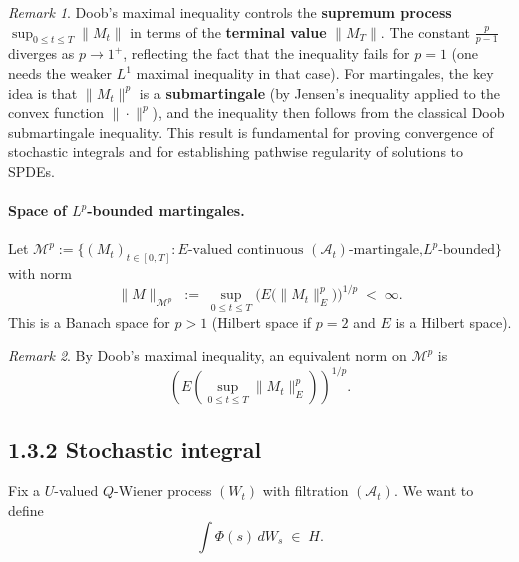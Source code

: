 \documentclass[11pt]{article}
\theoremstyle{definition}
\theoremstyle{remark}
\newtheorem{remark}{Remark}
\begin{document}
\begin{remark}
Doob's maximal inequality controls the \textbf{supremum process}
$\sup_{0 \le t \le T} \|M_t\|$ in terms of the \textbf{terminal value}
$\|M_T\|$.  The constant $\frac{p}{p-1}$ diverges as $p \to 1^+$,
reflecting the fact that the inequality fails for $p = 1$
(one needs the weaker $L^1$ maximal inequality in that case).
For martingales, the key idea is that $\|M_t\|^p$ is a
\textbf{submartingale} (by Jensen's inequality applied to the
convex function $\|\cdot\|^p$), and the inequality then follows
from the classical Doob submartingale inequality.
This result is fundamental for proving convergence of stochastic
integrals and for establishing pathwise regularity of solutions to SPDEs.
\end{remark}

\paragraph{Space of $L^p$-bounded martingales.}

Let $\mathcal{M}^p := \bigl\{(M_t)_{t \in [0,T]} :
\text{$E$-valued continuous $(\mathcal{A}_t)$-martingale,
$L^p$-bounded}\bigr\}$ with norm
\[
    \|M\|_{\mathcal{M}^p}
    \;:=\;
    \sup_{0 \le t \le T}
    \bigl(E\!\bigl(\|M_t\|_E^p\bigr)\bigr)^{1/p}
    \;<\; \infty.
\]
This is a Banach space for $p > 1$ (Hilbert space if $p = 2$
and $E$ is a Hilbert space).

\begin{remark}
By Doob's maximal inequality, an equivalent norm on $\mathcal{M}^p$ is
\[
    \left(E\!\left(\sup_{0 \le t \le T}
    \|M_t\|_E^p\right)\right)^{1/p}.
\]
\end{remark}

\subsection*{1.3.2 Stochastic integral}

Fix a $U$-valued $Q$-Wiener process $(W_t)$ with filtration
$(\mathcal{A}_t)$.  We want to define
\[
    \int \Phi(s)\,dW_s \;\in\; H.
\]
\end{document}

